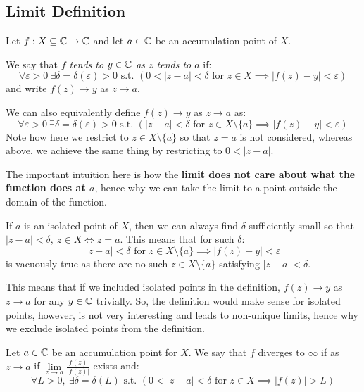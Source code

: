 \documentclass[../main.tex]{subfiles}
\begin{document}
\subsection{Limit Definition}
\begin{definition}
  Let $f: X \subseteq \mathbb{C} \to \mathbb{C}$ and let $a \in \mathbb{C}$ be an accumulation point of $X$.

  We say that \textit{$f$ tends to $y \in \mathbb{C}$ as $z$ tends to $a$} if:
  \label{limitDef}
  \[
    \forall \varepsilon > 0\ \exists \delta = \delta(\varepsilon) > 0 \text{ s.t. } (0 < |z - a| < \delta \text{ for } z \in X \implies |f(z) - y| < \varepsilon)
  \]
  and write $f(z) \to y$ as $z \to a$.
\end{definition}
\begin{remark}[Note]
  We can also equivalently define $f(z) \to y$ as $z \to a$ as:
  \[
    \forall \varepsilon > 0\ \exists \delta = \delta(\varepsilon) > 0 \text{ s.t. } (|z - a| < \delta \text{ for } z \in X \setminus \{a\} \implies |f(z) - y| < \varepsilon)
  \]
  Note how here we restrict to $z \in X \setminus \{a\}$ so that $z = a$ is not considered, whereas above, we achieve the same thing by restricting to $0 < |z - a|$.

  The important intuition here is how the \textbf{limit does not care about what the function does at $a$}, hence why we can take the limit to a point outside the domain of the function.
\end{remark}
\begin{remark}
  If $a$ is an isolated point of $X$, then we can always find $\delta$ sufficiently small so that $|z - a| < \delta,\ z \in X \iff z = a$.
  This means that for such $\delta$:
  \[
    |z - a| < \delta \text{ for } z \in X \setminus \{a\} \implies |f(z) - y| < \varepsilon
  \]
  is vacuously true as there are no such $z \in X \setminus \{a\}$ satisfying $|z - a| < \delta$.

  This means that if we included isolated points in the definition, $f(z) \to y$ as $z \to a$ for any $y \in \mathbb{C}$ trivially.
  So, the definition would make sense for isolated points, however, is not very interesting and leads to non-unique limits, hence why we exclude isolated points from the definition.
\end{remark}
\begin{definition}
  Let $a \in \mathbb{C}$ be an accumulation point for $X$.
  We say that $f$ diverges to $\infty$ if as $z \to a$ if $\lim\limits_{z \to a} \frac{f(z)}{|f(z)|}$ exists and:
  \[
    \forall L > 0,\ \exists \delta = \delta(L) \text{ s.t. } (0 < |z - a| < \delta \text{ for } z \in X \implies |f(z)| > L)
  \]
\end{definition}
\end{document}
